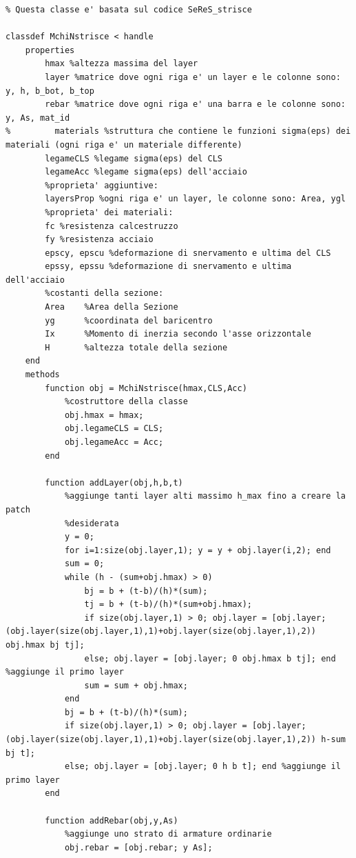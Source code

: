\documentclass[10pt]{article}
\begin{document}
\begin{lstlisting}
% Questa classe e' basata sul codice SeReS_strisce

classdef MchiNstrisce < handle
    properties
        hmax %altezza massima del layer
        layer %matrice dove ogni riga e' un layer e le colonne sono: y, h, b_bot, b_top
        rebar %matrice dove ogni riga e' una barra e le colonne sono: y, As, mat_id
%         materials %struttura che contiene le funzioni sigma(eps) dei materiali (ogni riga e' un materiale differente)
        legameCLS %legame sigma(eps) del CLS
        legameAcc %legame sigma(eps) dell'acciaio
        %proprieta' aggiuntive:
        layersProp %ogni riga e' un layer, le colonne sono: Area, ygl
        %proprieta' dei materiali:
        fc %resistenza calcestruzzo
        fy %resistenza acciaio
        epscy, epscu %deformazione di snervamento e ultima del CLS
        epssy, epssu %deformazione di snervamento e ultima dell'acciaio
        %costanti della sezione:
        Area    %Area della Sezione
        yg      %coordinata del baricentro
        Ix      %Momento di inerzia secondo l'asse orizzontale
        H       %altezza totale della sezione
    end
    methods
        function obj = MchiNstrisce(hmax,CLS,Acc)
            %costruttore della classe
            obj.hmax = hmax;
            obj.legameCLS = CLS;
            obj.legameAcc = Acc;
        end
        
        function addLayer(obj,h,b,t)
            %aggiunge tanti layer alti massimo h_max fino a creare la patch
            %desiderata
            y = 0;
            for i=1:size(obj.layer,1); y = y + obj.layer(i,2); end
            sum = 0;
            while (h - (sum+obj.hmax) > 0)
                bj = b + (t-b)/(h)*(sum);
                tj = b + (t-b)/(h)*(sum+obj.hmax);
                if size(obj.layer,1) > 0; obj.layer = [obj.layer; (obj.layer(size(obj.layer,1),1)+obj.layer(size(obj.layer,1),2)) obj.hmax bj tj];
                else; obj.layer = [obj.layer; 0 obj.hmax b tj]; end %aggiunge il primo layer
                sum = sum + obj.hmax;
            end
            bj = b + (t-b)/(h)*(sum);
            if size(obj.layer,1) > 0; obj.layer = [obj.layer; (obj.layer(size(obj.layer,1),1)+obj.layer(size(obj.layer,1),2)) h-sum bj t];
            else; obj.layer = [obj.layer; 0 h b t]; end %aggiunge il primo layer
        end
        
        function addRebar(obj,y,As)
            %aggiunge uno strato di armature ordinarie
            obj.rebar = [obj.rebar; y As];
            

\end{lstlisting}
\end{document}
